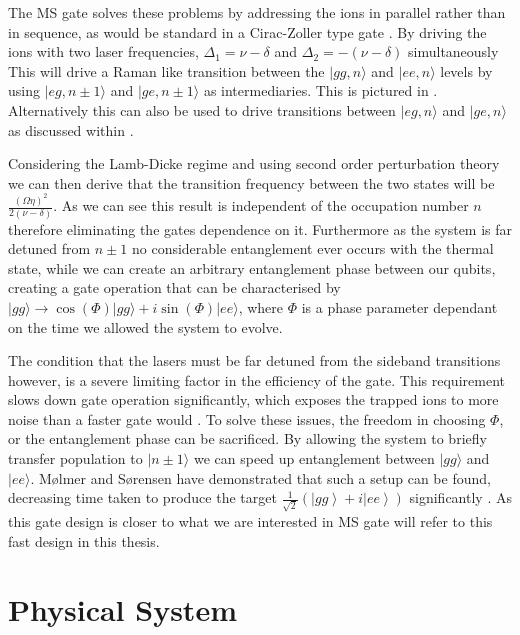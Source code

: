 \documentclass[12pt,twoside]{report}
\begin{document}
The MS gate solves these problems by addressing the ions in parallel rather than in sequence, as would be standard in a Cirac-Zoller type gate \cite{Cirac_Zoller}. By driving the ions with two laser frequencies, $\Delta_1=\nu-\delta$ and $\Delta_2=-(\nu-\delta)$ simultaneously  This will drive a Raman like \cite{Foot} transition between the $|gg,n\rangle$ and $|ee,n\rangle$ levels by using $|eg,n\pm 1\rangle$ and $|ge,n\pm 1\rangle$ as intermediaries. This is pictured in . Alternatively this can also be used to drive transitions between $|eg,n\rangle$ and $|ge,n\rangle$ as discussed within \cite{MS_gate}.

Considering the Lamb-Dicke regime and using second order perturbation theory we can then derive that the transition frequency between the two states will be $\frac{\left(\Omega\eta\right)^2}{2\left(\nu-\delta\right)}$\cite{MS_gate}. As we can see this result is independent of the occupation number $n$ therefore eliminating the gates dependence on it. Furthermore as the system is far detuned from $n\pm1$ no considerable entanglement ever occurs with the thermal state, while we can create an arbitrary entanglement phase between our qubits, creating a gate operation that can be characterised by $|gg\rangle\rightarrow\cos\left(\Phi\right)|gg\rangle + i\sin\left(\Phi\right)|ee\rangle$, where $\Phi$ is a phase parameter dependant on the time we allowed the system to evolve.

The condition that the lasers must be far detuned from the sideband transitions however, is a severe limiting factor in the efficiency of the gate. This requirement slows down gate operation significantly, which exposes the trapped ions to more noise than a faster gate would \cite{Trapped_ion_qbit_toolbox}. To solve these issues, the freedom in choosing $\Phi$, or the entanglement phase can be sacrificed. By allowing the system to briefly transfer population to $|n\pm 1\rangle$ we can speed up entanglement between $|gg\rangle$ and $|ee\rangle$. M\o lmer and S\o rensen have demonstrated that such a setup can be found, decreasing time taken to produce the target $\frac{1}{\sqrt{2}}\left(\left|gg\right\rangle + i\left|ee\right\rangle\right)$ significantly \cite{Fast_MS}. As this gate design is closer to what we are interested in MS gate will refer to this fast design in this thesis.

\section{Physical System}
\label{Background:PhysSys}
\end{document}
